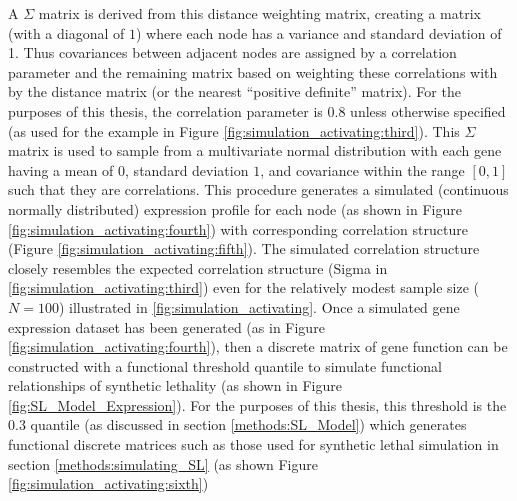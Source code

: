 A $\Sigma$ matrix is derived from this distance weighting matrix, creating a matrix (with a diagonal of $1$) where each node has a variance and standard deviation of 1. Thus covariances between adjacent nodes are assigned by a correlation parameter and the remaining matrix based on weighting these correlations with by the distance matrix (or the nearest ``positive definite'' matrix). For the purposes of this thesis, the correlation parameter is $0.8$ unless otherwise specified (as used for the example in Figure \ref{fig:simulation_activating:third}). This $\Sigma$ matrix is used to sample from a multivariate normal distribution with each gene having a mean of $0$, standard deviation $1$, and covariance within the range $[0,1]$ such that they are correlations. This procedure generates a simulated (continuous normally distributed) expression profile for each node (as shown in Figure \ref{fig:simulation_activating:fourth}) with corresponding correlation structure (Figure \ref{fig:simulation_activating:fifth}). The simulated correlation structure closely resembles the expected correlation structure (Sigma in \ref{fig:simulation_activating:third}) even for the relatively modest sample size ($N=100$) illustrated in \ref{fig:simulation_activating}. Once a simulated gene expression dataset has been generated (as in Figure \ref{fig:simulation_activating:fourth}), then a discrete matrix of gene function can be constructed with a functional threshold quantile to simulate functional relationships of synthetic lethality (as shown in Figure \ref{fig:SL_Model_Expression}). For the purposes of this thesis, this threshold is the 0.3 quantile (as discussed in section \ref{methods:SL_Model}) which generates functional discrete matrices such as those used for synthetic lethal simulation in section \ref{methods:simulating_SL} (as shown Figure \ref{fig:simulation_activating:sixth})

